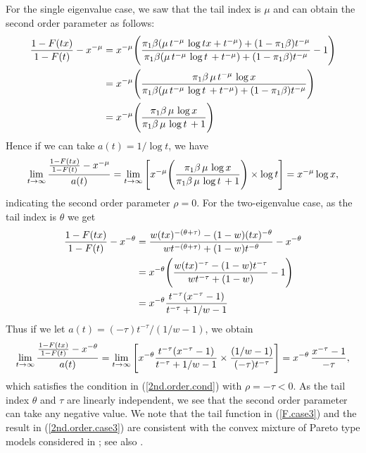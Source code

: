 \documentclass[11pt]{article}
\begin{document}
For the single eigenvalue case, we saw that the tail index is $\mu$ and can obtain the second order parameter as follows:
\begin{align}
\label{}
    \frac{1-F(tx)}{1-F(t)}-x^{-\mu}&=  x^{-\mu}\Bigg{(}\frac{\pi_1\beta(\mu \, t^{-\mu} \, \log tx+t^{-\mu})+(1-\pi_1\beta)t^{-\mu}}{\pi_1\beta(\mu \, t^{-\mu}\, \log t \, +t^{-\mu})+(1-\pi_1\beta)t^{-\mu}}-1\Bigg{)}\\
    &  = x^{-\mu}\Bigg{(}\frac{\pi_1\beta \, \mu \, t^{-\mu}\, \log x  }{\pi_1\beta(\mu \, t^{-\mu}\, \log t \, +t^{-\mu})+(1-\pi_1\beta)t^{-\mu}}\Bigg{)}\\
    &  = x^{-\mu}\Bigg{(}\frac{\pi_1\beta \, \mu \,  \log x  }{\pi_1\beta\, \mu \,  \log t \, +1}\Bigg{)}\\
\end{align}
Hence if we can take $a(t)=1/\log t$, we have
\begin{equation}
\label{ }
\lim_{t \rightarrow \infty}\frac{\frac{1-F(tx)}{1-F(t)}-x^{-\mu}}{a(t)}=\lim_{t \rightarrow \infty}\Bigg{[}  x^{-\mu}\Bigg{(}\frac{\pi_1\beta \, \mu \,  \log x  }{\pi_1\beta\, \mu \,  \log t \, +1}\Bigg{)}\times \log t \Bigg{]}= x^{-\mu} \log x,
\end{equation} indicating the second order parameter $\rho =0$.
For the two-eigenvalue case, as the tail index is $\theta$ we get
\begin{align}
\label{}
    \frac{1-F(tx)}{1-F(t)}-x^{-\theta}&= \frac{w(tx)^{-(\theta+\tau)}-(1-w)(tx)^{-\theta}}{ wt^{-(\theta+\tau)}+(1-w)t^{-\theta}} -x^{-\theta}\\
    &=x^{-\theta}\Bigg{(}\frac{w(tx)^{-\tau}-(1-w)t^{-\tau}}{ wt^{-\tau}+(1-w) }-1\Bigg{)}\\
    &  = x^{-\theta}  \frac{t^{-\tau}(x^{-\tau}-1)}{t^{-\tau}+1/w-1}   \\
\end{align}
Thus if we let $a(t)=({-\tau})t^{-\tau}/(1/w-1)$, we obtain
\begin{equation}
\label{2nd.order.case3}
\lim_{t \rightarrow \infty}\frac{\frac{1-F(tx)}{1-F(t)}-x^{-\theta}}{a(t)}= \lim_{t \rightarrow \infty} \Bigg{[}x^{-\theta}  \frac{t^{-\tau}(x^{-\tau}-1)}{t^{-\tau}+1/w-1}  \times \frac{(1/w-1)}{({-\tau})t^{-\tau}}\Bigg{]}=x^{-\theta}\, \frac{x^{-\tau}-1}{-\tau},
\end{equation} which satisfies the condition in (\ref{2nd.order.cond}) with $\rho=-\tau <0$. As the tail index $\theta$ and $\tau$ are linearly independent, we see that the second order parameter can take any negative value. We note that the tail function in (\ref{F.case3}) and the result in (\ref{2nd.order.case3}) are consistent with the convex mixture of Pareto type models considered in \cite{Feuer+Hall+etal:99a}; see also \cite{Geluk+De-Ha+etal:97a}. \\
\end{document}
